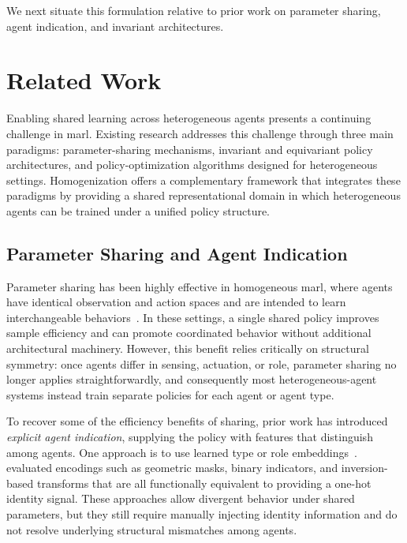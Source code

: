 \documentclass[]{jair}
\begin{document}
We next situate this formulation relative to prior work on parameter sharing, 
agent indication, and invariant architectures.


\section{Related Work}
\label{con2:sec:related_work}

Enabling shared learning across heterogeneous agents 
presents a continuing challenge in \gls{marl}.
Existing research addresses this challenge through three main paradigms: 
parameter-sharing mechanisms, invariant and equivariant policy architectures, 
and policy-optimization algorithms designed for heterogeneous settings. 
Homogenization offers a complementary framework that integrates these 
paradigms by providing a shared representational domain in which 
heterogeneous agents can be trained under a unified policy structure.

\subsection{Parameter Sharing and Agent Indication}

Parameter sharing has been highly effective in homogeneous \gls{marl},
where agents have identical observation and action spaces and are intended
to learn interchangeable behaviors~\cite{gupta2017, foerster2018}.
In these settings, a single shared policy improves sample efficiency and
can promote coordinated behavior without additional architectural machinery.
However, this benefit relies critically on structural symmetry:
once agents differ in sensing, actuation, or role, parameter sharing
no longer applies straightforwardly, and consequently most heterogeneous-agent
systems instead train separate policies for each agent or agent type.

To recover some of the efficiency benefits of sharing, 
prior work has introduced \emph{explicit agent indication},
supplying the policy with features that distinguish among agents.
One approach is to use learned type or role embeddings~\cite{christianos2021, albrecht2024}.
\citet{terry2020} evaluated encodings such as geometric masks, 
binary indicators, and inversion-based transforms that are all 
functionally equivalent to providing a one-hot identity signal.
These approaches allow divergent behavior under shared parameters, 
but they still require manually injecting identity information and 
do not resolve underlying structural mismatches among agents.
\end{document}
